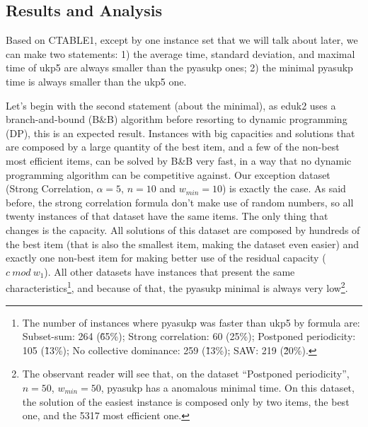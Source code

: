 \documentclass[runningheads,a4paper]{llncs}
\begin{document}
\subsection{Results and Analysis}

Based on CTABLE1, except by one instance set that we will talk about later, we can make two statements: 1) the average time, standard deviation, and maximal time of ukp5 are always smaller than the pyasukp ones; 2) the minimal pyasukp time is always smaller than the ukp5 one.

Let's begin with the second statement (about the minimal), as eduk2 uses a branch-and-bound (B\&B) algorithm before resorting to dynamic programming (DP), this is an expected result. Instances with big capacities and solutions that are composed by a large quantity of the best item, and a few of the non-best most efficient items, can be solved by B\&B very fast, in a way that no dynamic programming algorithm can be competitive against. Our exception dataset (Strong Correlation, \(\alpha = 5\), \(n = 10\) and \(w_{min} = 10\)) is exactly the case. As said before, the strong correlation formula don't make use of random numbers, so all twenty instances of that dataset have the same items. The only thing that changes is the capacity. All solutions of this dataset are composed by hundreds of the best item (that is also the smallest item, making the dataset even easier) and exactly one non-best item for making better use of the residual capacity (\(c~mod~w_1\)). All other datasets have instances that present the same characteristics\footnote{The number of instances where pyasukp was faster than ukp5 by formula are: Subset-sum: 264 (\~65\%); Strong correlation: 60 (25\%); Postponed periodicity: 105 (\~13\%); No collective dominance: 259 (\~13\%); SAW: 219 (\~20\%).}, and because of that, the pyasukp minimal is always very low\footnote{The observant reader will see that, on the dataset ``Postponed periodicity'', \(n = 50\), \(w_{min} = 50\), pyasukp has a anomalous minimal time. On this dataset, the solution of the easiest instance is composed only by two items, the best one, and the 5317 most efficient one.}.
\end{document}
